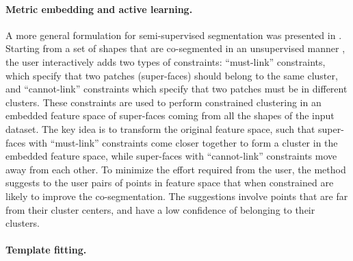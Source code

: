\paragraph*{Metric embedding and active learning.} A more general formulation for semi-supervised segmentation was presented in \cite{Wang:2012:ACS}.
Starting from a set of shapes that are co-segmented in an unsupervised manner \cite{Sidi:2011:CS}, the user interactively adds two types of constraints: ``must-link'' constraints, which specify that two patches (super-faces) should belong to the same cluster, and ``cannot-link'' constraints which specify that two patches  must be in different clusters. These constraints are used to perform constrained clustering in an embedded feature space of super-faces coming from all the shapes of the input dataset. The key idea is to transform the original feature space, such that super-faces with ``must-link'' constraints come closer together to form a cluster in the embedded feature space, while super-faces with ``cannot-link'' constraints move away from each other. To minimize the effort required from the user, the method suggests to the user pairs of points in feature space that when constrained are likely to improve the co-segmentation.  The suggestions involve points that are far from their cluster centers, and have a low confidence of belonging to their clusters.

\paragraph*{Template fitting.} 


